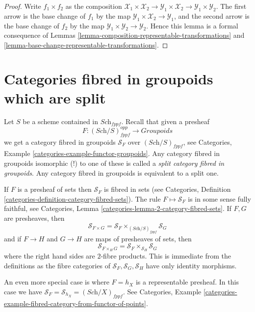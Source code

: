 \begin{proof}
Write $f_1 \times f_2$ as the composition
$\mathcal{X}_1 \times \mathcal{X}_2 \to
\mathcal{Y}_1 \times \mathcal{X}_2 \to
\mathcal{Y}_1 \times \mathcal{Y}_2$.
The first arrow is the base change of $f_1$ by the map
$\mathcal{Y}_1 \times \mathcal{X}_2 \to \mathcal{Y}_1$, and the second arrow
is the base change of $f_2$ by the map
$\mathcal{Y}_1 \times \mathcal{Y}_2 \to \mathcal{Y}_2$.
Hence this lemma is a formal
consequence of Lemmas \ref{lemma-composition-representable-transformations}
and \ref{lemma-base-change-representable-transformations}.
\end{proof}



\section{Categories fibred in groupoids which are split}
\label{section-split}

\noindent
Let $S$ be a scheme contained in $\textit{Sch}_{fppf}$.
Recall that given a presheaf
$$
F : (\textit{Sch}/S)_{fppf}^{opp} \longrightarrow \textit{Groupoids}
$$
we get a category fibred in groupoids $\mathcal{S}_F$ over
$(\textit{Sch}/S)_{fppf}$, see
Categories, Example \ref{categories-example-functor-groupoids}.
Any category fibred in groupoids isomorphic (!) to one of these
is called a {\it split category fibred in groupoids}.
Any category fibred in groupoids is equivalent to a split one.

\medskip\noindent
If $F$ is a presheaf of sets then $\mathcal{S}_F$ is
fibred in sets (see
Categories,
Definition \ref{categories-definition-category-fibred-sets}).
The rule $F \mapsto \mathcal{S}_F$ is in some sense fully faithful, see
Categories, Lemma \ref{categories-lemma-2-category-fibred-sets}.
If $F, G$ are presheaves, then
$$
\mathcal{S}_{F \times G}
=
\mathcal{S}_F \times_{(\textit{Sch}/S)_{fppf}} \mathcal{S}_G
$$
and if $F \to H$ and $G \to H$ are maps of presheaves of sets, then
$$
\mathcal{S}_{F \times_H G} =
\mathcal{S}_F \times_{\mathcal{S}_H} \mathcal{S}_G
$$
where the right hand sides are $2$-fibre products. This is immediate
from the definitions as the fibre categories of
$\mathcal{S}_F, \mathcal{S}_G, \mathcal{S}_H$ have only identity morphisms.

\medskip\noindent
An even more special case is where $F = h_X$ is a representable
presheaf. In this case we have
$\mathcal{S}_F = \mathcal{S}_{h_X} = (\textit{Sch}/X)_{fppf}$. See
Categories,
Example \ref{categories-example-fibred-category-from-functor-of-points}.

